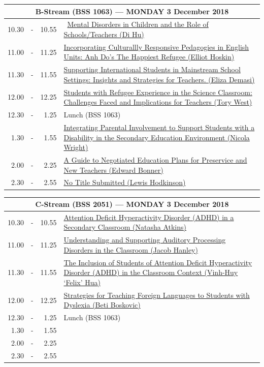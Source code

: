 \documentclass[twoside,12pt,a4paper,notitlepage]{memoir}
\begin{document}
\begin{center}
\begin{tabular}{rcr|p{10.8cm}}
\multicolumn{4}{c}{{\large B-Stream (BSS 1063) --- MONDAY 3 December 2018}} \\ \hline
 10.30 & - & 10.55 & 
\ \hyperref[aut:hu]{Mental Disorders in Children and the Role of Schools/Teachers (Di Hu)} \\ \hline
11.00 & - & 11.25 &
 \hyperref[aut:hoskin]{Incorporating Culturallly Responsive Pedagogies in English Units: Anh Do's The Happiest Refugee (Elliot Hoskin)} \\ \hline
11.30 & - & 11.55 &
 \hyperref[aut:demasi]{Supporting International Students in Mainstream School Settings: Insights and Strategies for Teachers. (Eliza Demasi)} \\ \hline
12.00 & - & 12.25 &
 \hyperref[aut:west]{Students with Refugee Experience in the Science Classroom: Challenges Faced and Implications for Teachers (Tory West)} \\ \hline
12.30 & - & 1.25 & Lunch (BSS 1063) \\ \hline
1.30 & - & 1.55 &
 \hyperref[aut:wright]{Integrating Parental Involvement to Support Students with a Disability in the Secondary Education Environment (Nicola Wright)} \\ \hline
2.00 & - & 2.25 &
 \hyperref[aut:bonner]{A Guide to Negotiated Education Plans for Preservice and New Teachers (Edward Bonner)} \\ \hline
2.30 & - & 2.55 &
 \hyperref[aut:hodkinson]{No Title Submitted (Lewis Hodkinson)} \\ \hline
\end{tabular}
\end{center}

\pagebreak
\vspace*{0cm}
\begin{center}
\begin{tabular}{rcr|p{10.8cm}}
 \multicolumn{4}{c}{{\large C-Stream (BSS 2051) --- MONDAY 3 December 2018}} \\ \hline
 10.30 & - & 10.55 & 
 \hyperref[aut:atkins]{Attention Deficit Hyperactivity Disorder (ADHD) in a Secondary Classroom (Natasha Atkins)} \\ \hline
11.00 & - & 11.25 &
 \hyperref[aut:hanley]{Understanding and Supporting Auditory Processing Disorders in the Classroom (Jacob Hanley)} \\ \hline
11.30 & - & 11.55 &
\hyperref[aut:hua]{The Inclusion of Students of Attention Deficit Hyperactivity Disorder (ADHD) in the Classroom Context (Vinh-Huy `Felix' Hua)} \\ \hline
12.00 & - & 12.25 &
 \hyperref[aut:boskovic]{Strategies for Teaching Foreign Languages to Students with Dyslexia (Beti Boskovic)} \\ \hline
12.30 & - & 1.25 & Lunch (BSS 1063) \\ \hline
1.30 & - & 1.55 &
 \\ \hline
2.00 & - & 2.25 &
 \\ \hline
2.30 & - & 2.55 &
 \\ \hline
\end{tabular}
\end{center}
\end{document}
